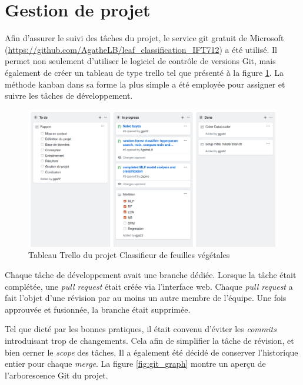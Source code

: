 \section{Gestion de projet}
    Afin d'assurer le suivi des tâches du projet, le service git gratuit de Microsoft (\url{https://github.com/AgatheLB/leaf_classification_IFT712}) a été utilisé. Il permet non seulement d'utiliser le logiciel de contrôle de versions Git, mais également de créer un tableau de type trello tel que présenté à la figure \ref{fig:trello_board_models}. La méthode kanban dans sa forme la plus simple a été employée pour assigner et suivre les tâches de développement.

    \begin{figure}[H]
        \centering
        \includegraphics[width=15cm]{images/board.png}
        \caption[Tableau Trello du volet modèles]{Tableau Trello du projet Classifieur de feuilles végétales}
        \label{fig:trello_board_models}
    \end{figure}

    Chaque tâche de développement avait une branche dédiée. Lorsque la tâche était complétée, une \textit{pull request} était créée via l'interface web. Chaque \textit{pull request} a fait l'objet d'une révision par au moins un autre membre de l'équipe. Une fois approuvée et fusionnée, la branche était supprimée.

    Tel que dicté par les bonnes pratiques, il était convenu d'éviter les \textit{commits} introduisant trop de changements. Cela afin de simplifier la tâche de révision, et bien cerner le \textit{scope} des tâches. Il a également été décidé de conserver l'historique entier pour chaque \textit{merge}. La figure \ref{fig:git_graph} montre un aperçu de l'arborescence Git du projet.

